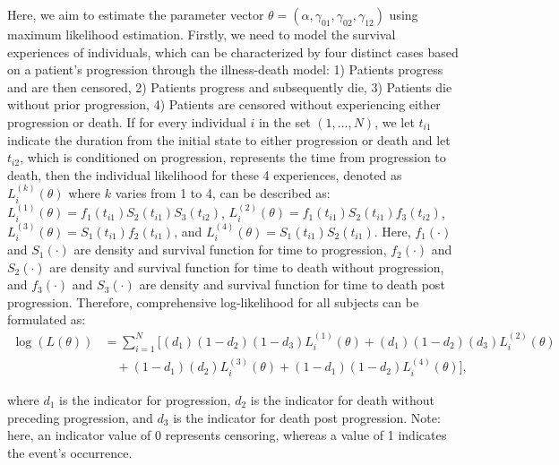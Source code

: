 Here, we aim to estimate the parameter vector $\theta = (\alpha, \gamma_{01}, \gamma_{02}, \gamma_{12})$ using maximum likelihood estimation. Firstly, we need to model the survival experiences of individuals, which can be characterized by four distinct cases based on a patient's progression through the illness-death model:
1) Patients progress and are then censored,
2) Patients progress and subsequently die,
3) Patients die without prior progression,
4) Patients are censored without experiencing either progression or death. If for every individual \( i \) in the set \( (1, ..., N) \), we let \( t_{i1} \) indicate the duration from the initial state to either progression or death and let \( t_{i2} \), which is conditioned on progression, represents the time from progression to death, then the individual likelihood for these 4 experiences, denoted as \( L_i^{(k)}(\theta) \) where \( k \) varies from 1 to 4, can be described as: $L_i^{(1)}(\theta) = f_1(t_{i1})S_2(t_{i1})S_3(t_{i2})$, $L_i^{(2)}(\theta) = f_1(t_{i1})S_2(t_{i1})f_3(t_{i2})$, $L_i^{(3)}(\theta) = S_1(t_{i1})f_2(t_{i1})$, and $L_i^{(4)}(\theta) = S_1(t_{i1})S_2(t_{i1})$. Here, \( f_1(\cdot) \) and \( S_1(\cdot) \) are density and survival function for time to progression, \( f_2(\cdot) \) and \( S_2(\cdot) \) are density and survival function for time to death without progression, and \( f_3(\cdot) \) and \( S_3(\cdot) \) are density and survival function for time to death post progression. Therefore, comprehensive log-likelihood for all subjects can be formulated as:
\[
\begin{aligned}
\log(L(\theta)) &= \sum_{i=1}^{N}[(d_1)(1-d_2)(1-d_3)L_i^{(1)}(\theta) + (d_1)(1-d_2)(d_3)L_i^{(2)}(\theta) \\
&\quad +(1-d_1)(d_2)L_i^{(3)}(\theta) + (1-d_1)(1-d_2)L_i^{(4)}(\theta)],
\end{aligned}
\]

where \( d_1 \) is the indicator for progression, \( d_2 \) is the indicator for death without preceding progression, and \( d_3 \) is the indicator for death post progression. Note: here, an indicator value of 0 represents censoring, whereas a value of 1 indicates the event's occurrence.


